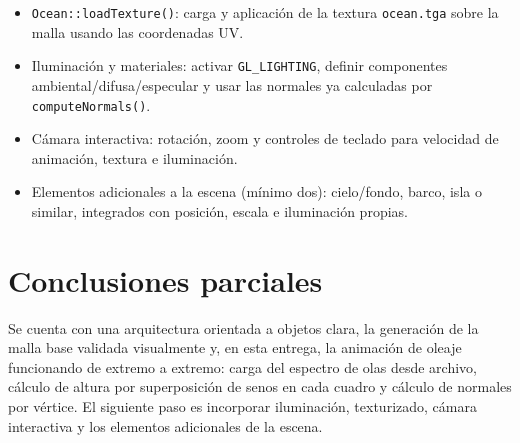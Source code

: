 \documentclass[11pt]{article}
\begin{document}
\begin{itemize}
  \item \texttt{Ocean::loadTexture()}: carga y aplicación de la textura
        \texttt{ocean.tga} sobre la malla usando las coordenadas UV.
  \item Iluminación y materiales: activar \texttt{GL\_LIGHTING}, definir
        componentes ambiental/difusa/especular y usar las normales ya
        calculadas por \texttt{computeNormals()}.
  \item Cámara interactiva: rotación, zoom y controles de teclado para
        velocidad de animación, textura e iluminación.
  \item Elementos adicionales a la escena (mínimo dos): cielo/fondo, barco,
        isla o similar, integrados con posición, escala e iluminación propias.
\end{itemize}

\section{Conclusiones parciales}

Se cuenta con una arquitectura orientada a objetos clara, la generación de la
malla base validada visualmente y, en esta entrega, la animación de oleaje
funcionando de extremo a extremo: carga del espectro de olas desde archivo,
cálculo de altura por superposición de senos en cada cuadro y cálculo de
normales por vértice. El siguiente paso es incorporar iluminación, texturizado,
cámara interactiva y los elementos adicionales de la escena.
\end{document}

